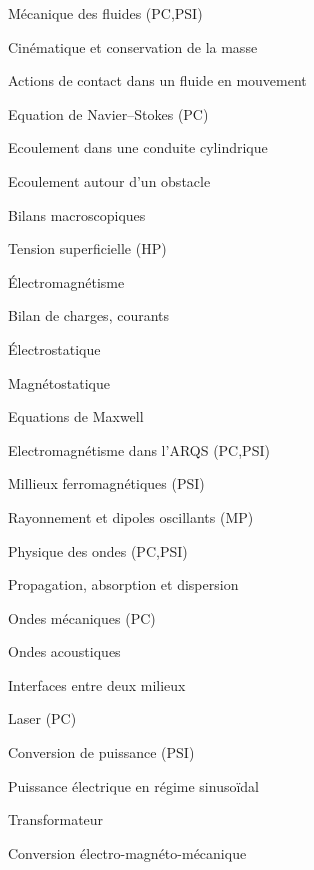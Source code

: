 \begin{multicols}{2}
\begin{programme}
\begin{programme}
    \end{programme}
    \item Mécanique des fluides (PC,PSI)
    \begin{programme}
        \item Cinématique et conservation de la masse
        \item Actions  de  contact  dans  un  fluide  en mouvement
        \item Equation de Navier--Stokes (PC)
        \item Ecoulement dans une conduite cylindrique
        \item Ecoulement autour d'un obstacle
        \item Bilans macroscopiques
        \item Tension superficielle (HP)
    \end{programme}
    \item \'Electromagnétisme
    \begin{programme}
        \item Bilan de charges, courants
        \item \'Electrostatique
        \item Magnétostatique
        \item Equations de Maxwell
        \item Electromagnétisme dans l'ARQS (PC,PSI)
        \item Millieux ferromagnétiques (PSI)
        \item Rayonnement et dipoles oscillants (MP)
    \end{programme}
    \item Physique des ondes (PC,PSI)
        \begin{programme}
            \item Propagation, absorption et dispersion 
            \item Ondes mécaniques (PC)
            \item Ondes acoustiques 
            \item Interfaces entre deux milieux
            \item Laser (PC)
        \end{programme}
    \item Conversion de puissance (PSI)
        \begin{programme}
            \item Puissance électrique en régime sinusoïdal
            \item Transformateur
            \item Conversion électro-magnéto-mécanique

\end{programme}
\end{programme}
\end{multicols}
